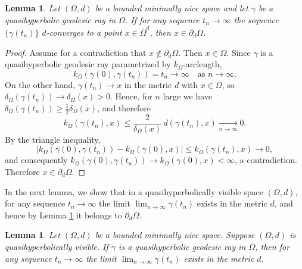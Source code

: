 \documentclass[a4paper,12pt]{amsart}
\newtheorem{lem}[equation]{Lemma}
\theoremstyle{definition}
\begin{document}
\begin{lem}\label{AV-P7-lem1}
	Let $(\Omega,d)$ be a bounded minimally nice space and let $\gamma$ be a quasihyperbolic geodesic ray in $\Omega$. If for any sequence $t_n\to \infty$ the sequence $\{\gamma(t_n)\}$ $d$-converges to a point $x\in \overline{\Omega}^d$, then $x\in \partial_{d}\Omega$.
\end{lem}

\begin{proof}
	Assume for a contradiction that $x\notin \partial_{d}\Omega$. Then $x\in \Omega$.
	Since $\gamma$ is a quasihyperbolic geodesic ray parametrized by $k_\Omega$-arclength,
	\[
	k_{\Omega}(\gamma(0),\gamma(t_n))=t_n\to\infty \quad \text{as } n\to\infty.
	\]
	On the other hand, $\gamma(t_n)\to x$ in the metric $d$ with $x\in\Omega$, so
	$\delta_\Omega(\gamma(t_n))\to \delta_\Omega(x)>0$. Hence, for $n$ large we have
	$\delta_\Omega(\gamma(t_n))\ge \frac{1}{2}\delta_\Omega(x)$, and therefore
	\[
	k_\Omega(\gamma(t_n),x)\le \frac{2}{\delta_\Omega(x)}\, d(\gamma(t_n),x)\xrightarrow[n\to\infty]{}0.
	\]
	By the triangle inequality,
	\[
	\bigl|k_\Omega(\gamma(0),\gamma(t_n)) - k_\Omega(\gamma(0),x)\bigr|\le k_\Omega(\gamma(t_n),x)\to 0,
	\]
	and consequently $k_\Omega(\gamma(0),\gamma(t_n))\to k_\Omega(\gamma(0),x)<\infty$, a contradiction. Therefore $x\in \partial_{d}\Omega$.
\end{proof}

In the next lemma, we show that in a quasihyperbolically visible space $(\Omega,d)$, for any sequence $t_n\to \infty$ the limit $\lim_{n\to \infty}\gamma(t_n)$ exists in the metric $d$, and hence by Lemma \ref{AV-P7-lem1} it belongs to $\partial_{d}\Omega$.

\begin{lem}\label{AV-P7-lem1.1}
	Let $(\Omega,d)$ be a bounded minimally nice space. Suppose $(\Omega,d)$ is quasihyperbolically visible. If $\gamma$ is a quasihyperbolic geodesic ray in $\Omega$, then for any sequence $t_n\to \infty$ the limit $\lim_{n\to \infty}\gamma(t_n)$ exists in the metric $d$.
\end{lem}
\end{document}
